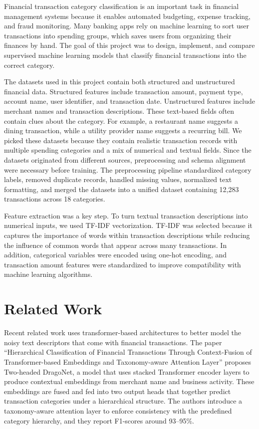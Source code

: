 \documentclass[11pt]{article}
\begin{document}
Financial transaction category classification is an important task in
financial management systems because it enables automated budgeting,
expense tracking, and fraud monitoring. Many banking apps rely on machine
learning to sort user transactions into spending groups, which saves
users from organizing their finances by hand. The goal of this project
was to design, implement, and compare supervised machine learning models
that classify financial transactions into the correct category.

The datasets used in this project contain both structured and unstructured
financial data. Structured features include transaction amount, payment type,
account name, user identifier, and transaction date. Unstructured features
include merchant names and transaction descriptions. These text-based fields
often contain clues about the category. For example, a restaurant name
suggests a dining transaction, while a utility provider name suggests a
recurring bill. We picked these datasets because they contain realistic
transaction records with multiple spending categories and a mix of
numerical and textual fields. Since the
datasets originated from different sources, preprocessing and schema
alignment were necessary before training. The preprocessing pipeline
standardized category labels, removed duplicate records, handled missing
values, normalized text formatting, and merged the datasets into a unified
dataset containing 12{,}283 transactions across 18 categories.

Feature extraction was a key step. To turn textual transaction
descriptions into numerical inputs, we used TF-IDF vectorization. TF-IDF was selected because it captures the
importance of words within transaction descriptions while reducing the
influence of common words that appear across many transactions. In addition,
categorical variables were encoded using one-hot encoding, and transaction
amount features were standardized to improve compatibility with machine
learning algorithms.

\section{Related Work}

Recent related work uses transformer-based architectures to better model
the noisy text descriptors that come with financial transactions. The paper
``Hierarchical Classification of Financial Transactions Through Context-Fusion
of Transformer-based Embeddings and Taxonomy-aware Attention Layer''
\cite{busson2023hierarchical} proposes Two-headed DragoNet, a model that uses
stacked Transformer encoder layers to produce contextual embeddings from
merchant name and business activity. These embeddings are fused and fed into
two output heads that together predict transaction categories under a
hierarchical structure. The authors introduce a taxonomy-aware attention
layer to enforce consistency with the predefined category hierarchy, and they
report F1-scores around 93--95\%.
\end{document}
